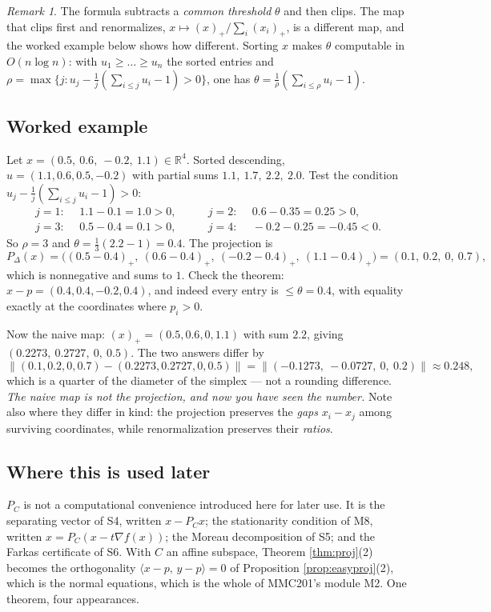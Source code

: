\documentclass[11pt,a4paper]{article}
\theoremstyle{definition}
\theoremstyle{plain}
\theoremstyle{remark}
\newtheorem*{remark}{Remark}
\newcommand{\R}{\mathbb{R}}
\newcommand{\ip}[2]{\langle #1,\, #2\rangle}
\newcommand{\norm}[1]{\lVert #1\rVert}
\newcommand{\proj}{P}
\newcommand{\Simplex}{\Delta}
\begin{document}
\begin{remark}
The formula subtracts a \emph{common threshold} $\theta$ and then clips. The map that clips
first and renormalizes, $x\mapsto(x)_+/\sum_i(x_i)_+$, is a different map, and the worked example
below shows how different. Sorting $x$ makes $\theta$ computable in $O(n\log n)$: with
$u_1\ge\dots\ge u_n$ the sorted entries and $\rho=\max\{j:u_j-\frac1j(\sum_{i\le j}u_i-1)>0\}$,
one has $\theta=\frac1\rho(\sum_{i\le\rho}u_i-1)$.
\end{remark}

\subsection*{Worked example}

Let $x=(0.5,\ 0.6,\ -0.2,\ 1.1)\in\R^4$. Sorted descending, $u=(1.1,0.6,0.5,-0.2)$ with partial
sums $1.1,\ 1.7,\ 2.2,\ 2.0$. Test the condition $u_j-\frac1j(\sum_{i\le j}u_i-1)>0$:
\[
\begin{aligned}
j=1:&\ \ 1.1-0.1=1.0>0, &\qquad j=2:&\ \ 0.6-0.35=0.25>0,\\
j=3:&\ \ 0.5-0.4=0.1>0, &\qquad j=4:&\ \ -0.2-0.25=-0.45<0 .
\end{aligned}
\]
So $\rho=3$ and $\theta=\tfrac13(2.2-1)=0.4$. The projection is
\[
\proj_{\Simplex}(x)=\big((0.5-0.4)_+,\ (0.6-0.4)_+,\ (-0.2-0.4)_+,\ (1.1-0.4)_+\big)
=(0.1,\ 0.2,\ 0,\ 0.7),
\]
which is nonnegative and sums to $1$. Check the theorem: $x-p=(0.4,0.4,-0.2,0.4)$, and indeed
every entry is $\le\theta=0.4$, with equality exactly at the coordinates where $p_i>0$.

Now the naive map: $(x)_+=(0.5,0.6,0,1.1)$ with sum $2.2$, giving
$(0.2273,\ 0.2727,\ 0,\ 0.5)$. The two answers differ by
\[
\norm{(0.1,0.2,0,0.7)-(0.2273,0.2727,0,0.5)}
=\norm{(-0.1273,\ -0.0727,\ 0,\ 0.2)}\approx0.248 ,
\]
which is a quarter of the diameter of the simplex --- not a rounding difference. \emph{The
naive map is not the projection, and now you have seen the number.} Note also where they differ
in kind: the projection preserves the \emph{gaps} $x_i-x_j$ among surviving coordinates, while
renormalization preserves their \emph{ratios}.

\subsection*{Where this is used later}

$\proj_C$ is not a computational convenience introduced here for later use. It is the
separating vector of S4, written $x-\proj_Cx$; the stationarity condition of M8, written
$x=\proj_C(x-t\nabla f(x))$; the Moreau decomposition of S5; and the Farkas certificate of S6.
With $C$ an affine subspace, Theorem \ref{thm:proj}(2) becomes the orthogonality $\ip{x-p}{y-p}=0$
of Proposition \ref{prop:easyproj}(2), which is the normal equations, which is the whole of
MMC201's module M2. One theorem, four appearances.
\end{document}
